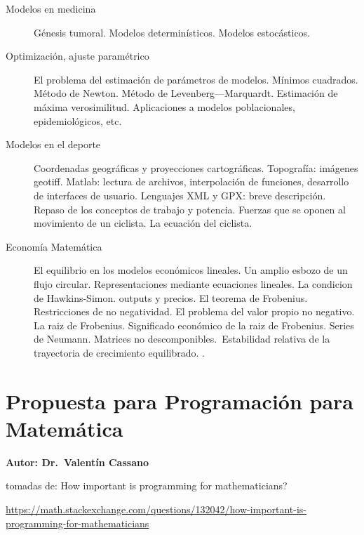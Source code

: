 \documentclass[a4paper,10pt,BCOR10mm,oneside,headsepline]{scrbook}
\begin{document}
\begin{enumerate}
\begin{description}
\item[Modelos en medicina] Génesis tumoral. Modelos determinísticos. Modelos estocásticos.     \cite{DominikWodarz734,EmmanuelBarillot736,M.Eisen733,JamesD.Murray744,W.Y.Tan732}

\item[Optimización, ajuste paramétrico] \cite{EdwardA.Bender715,NeilA.Gershenfeld717,OdoDiekmann614,LyleD.Broemeling615}
El problema del estimación de parámetros  de modelos. Mínimos cuadrados. Método de Newton.  
Método de Levenberg—Marquardt. Estimación de máxima verosimilitud.  Aplicaciones a modelos
poblacionales, epidemiológicos, etc. 


\item[Modelos en el deporte] Coordenadas geográficas y proyecciones cartográficas. Topografía: imágenes geotiff. Matlab: lectura de archivos, interpolación de funciones, desarrollo de interfaces de usuario. Lenguajes  XML y GPX: breve descripción. Repaso de los conceptos de trabajo y potencia. Fuerzas que se oponen al movimiento de un ciclista. La ecuación del ciclista. \cite{wilson2004bicycling}

\item[Economía Matemática]  El equilibrio en los modelos económicos lineales. Un amplio esbozo de un flujo circular. Representaciones mediante ecuaciones lineales. La condicion de Hawkins-Simon. outputs y precios.  El teorema de Frobenius. Restricciones de no negatividad. El problema del valor propio no negativo. La raiz de Frobenius. Significado económico de la raiz de Frobenius. Series de Neumann. Matrices no descomponibles. Estabilidad relativa de la trayectoria de crecimiento equilibrado. \cite{Nikaido}.



\end{description}



  


\end{enumerate}


\section{Propuesta para Programaci\'on para Matem\'atica}

\noindent\textbf{Autor: Dr.\ Valent\'in Cassano}

tomadas de: How important is programming for mathematicians?

\href{https://math.stackexchange.com/questions/132042/how-important-is-programming-for-mathematicians}{https://math.stackexchange.com/questions/132042/how-important-is-programming-for-mathematicians}
\end{document}
